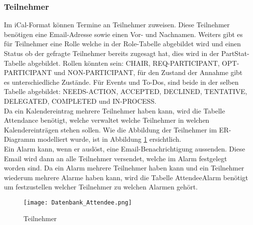 \subsubsection*{Teilnehmer}
\label{ref:teilnehmer}
Im iCal-Format können Termine an Teilnehmer zuweisen. Diese Teilnehmer benötigen eine Email-Adresse sowie einen Vor- und Nachnamen. Weiters gibt es für Teilnehmer eine Rolle welche in der Role-Tabelle abgebildet wird und einen Status ob der gefragte Teilnehmer bereits zugesagt hat, dies wird in der PartStat-Tabelle abgebildet. Rollen könnten sein: CHAIR, REQ-PARTICIPANT, OPT-PARTICIPANT und NON-PARTICIPANT, für den Zustand der Annahme gibt es unterschiedliche Zustände. Für Events und To-Dos, sind beide in der selben Tabelle abgebildet: NEEDS-ACTION, ACCEPTED, DECLINED, TENTATIVE, DELEGATED, COMPLETED und IN-PROCESS.\\
Da ein Kalendereintrag mehrere Teilnehmer haben kann, wird die Tabelle Attendance benötigt, welche verwaltet welche Teilnehmer in welchen Kalendereinträgen stehen sollen. Wie die Abbildung der Teilnehmer im ER-Diagramm modelliert wurde, ist in Abbildung \ref{fig:datenbankTeilnehmer} ersichtlich.\\
Ein Alarm kann, wenn er auslöst, eine Email-Benachrichtigung aussenden. Diese Email wird dann an alle Teilnehmer versendet, welche im Alarm festgelegt worden sind. Da ein Alarm mehrere Teilnehmer haben kann und ein Teilnehmer wiederum mehrere Alarme haben kann, wird die Tabelle AttendeeAlarm benötigt um festzustellen welcher Teilnehmer zu welchen Alarmen gehört.
\begin{figure}[H]
	\texttt{[image: Datenbank\_Attendee.png]}
    \caption{Teilnehmer}
    \label{fig:datenbankTeilnehmer}
\end{figure}
\pagebreak